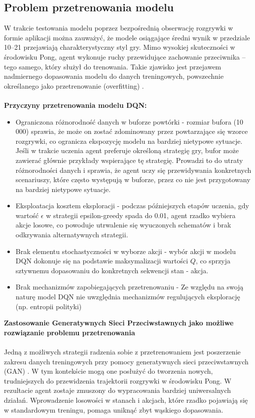 \documentclass[a4paper, 12pt]{article}
\numberwithin{equation}{section}
\begin{document}
    \subsection{Problem przetrenowania modelu}
    W trakcie testowania modelu poprzez bezpośrednią obserwację rozgrywki w formie aplikacji można zauważyć, że modele osiągające średni wynik w przedziale 10–21 przejawiają charakterystyczny styl gry. Mimo wysokiej skuteczności w środowisku Pong, agent wykonuje ruchy przewidujące zachowanie przeciwnika – tego samego, który służył do trenowania. Takie zjawisko jest przejawem nadmiernego dopasowania modelu do danych treningowych, powszechnie określanego jako przetrenowanie (overfitting) \cite{zhang2018study}.
    \\ \\ \textbf{Przyczyny przetrenowania modelu DQN:}
    \begin{itemize}
        \item Ograniczona różnorodność danych w buforze powtórki - rozmiar bufora (10  000) sprawia, że może on zostać zdominowany przez powtarzające się wzorce rozgrywki, co ogranicza ekspozycję modelu na bardziej nietypowe sytuacje.
        Jeśli w trakcie uczenia agent preferuje określoną strategię gry, bufor może zawierać głównie przykłady wspierające tę strategię. Prowadzi to do utraty różnorodności danych i sprawia, że agent uczy się przewidywania konkretnych scenariuszy, które często występują w buforze, przez co nie jest przygotowany na bardziej nietypowe sytuacje.
        \item Eksploatacja kosztem eksploracji - podczas późniejszych etapów uczenia, gdy wartość \( \epsilon \) w strategii epsilon-greedy spada do 0.01, agent rzadko wybiera akcje losowe, co powoduje utrwalenie się wyuczonych schematów i brak odkrywania alternatywnych strategii.
        \item Brak elementu stochastyczności w wyborze akcji - wybór akcji w modelu DQN dokonuje się na podstawie maksymalizacji wartości \( Q \), co sprzyja sztywnemu dopasowaniu do konkretnych sekwencji stan - akcja.
        \item Brak mechanizmów zapobiegających przetrenowaniu - Ze względu na swoją naturę model DQN nie uwzględnia mechanizmów regulujących eksplorację (np. entropii polityki)
    \end{itemize}
    \textbf{Zastosowanie Generatywnych Sieci Przeciwstawnych jako możliwe rozwiązanie problemu przetrenowania} 
    \\ \\ 
    Jedną z możliwych strategii radzenia sobie z przetrenowaniem jest poszerzenie zakresu danych treningowych przy pomocy generatywnych sieci przeciwstawnych (GAN) \cite{goodfellow2014generative}. W tym kontekście mogą one posłużyć do tworzenia nowych, trudniejszych do przewidzenia trajektorii rozgrywki w środowisku Pong. W rezultacie agent zostaje zmuszony do wypracowania bardziej uniwersalnych działań. Wprowadzenie losowości w stanach i akcjach, które rzadko pojawiają się w standardowym treningu, pomaga uniknąć zbyt wąskiego dopasowania.
\end{document}
